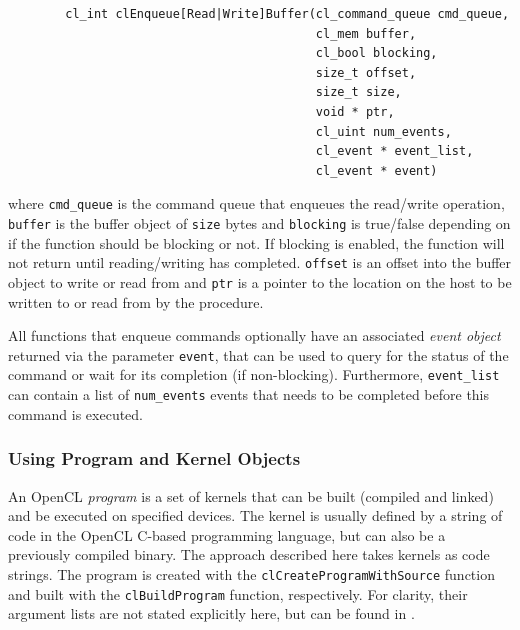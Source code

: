 		\begin{verbatim}
		cl_int clEnqueue[Read|Write]Buffer(cl_command_queue cmd_queue,
		                                   cl_mem buffer,
		                                   cl_bool blocking,
		                                   size_t offset,
		                                   size_t size,
		                                   void * ptr,
		                                   cl_uint num_events,
		                                   cl_event * event_list,
		                                   cl_event * event)
		\end{verbatim}
		
		where \texttt{cmd\_queue} is the command queue that enqueues the read/write operation, \texttt{buffer} is the buffer object of \texttt{size} bytes and \texttt{blocking} is true/false depending on if the function should be blocking or not. If blocking is enabled, the function will not return until reading/writing has completed. \texttt{offset} is an offset into the buffer object to write or read from and \texttt{ptr} is a pointer to the location on the host to be written to or read from by the procedure.
		
		All functions that enqueue commands optionally have an associated \emph{event object} returned via the parameter \texttt{event}, that can be used to query for the status of the command or wait for its completion (if non-blocking). Furthermore, \texttt{event\_list} can contain a list of \texttt{num\_events} events that needs to be completed before this command is executed.
		
	\subsubsection{Using Program and Kernel Objects}
	
		An OpenCL \emph{program} is a set of kernels that can be built (compiled and linked) and be executed on specified devices. The kernel is usually defined by a string of code in the OpenCL C-based programming language, but can also be a previously compiled binary. The approach described here takes kernels as code strings. The program is created with the \texttt{clCreateProgramWithSource} function and built with the \texttt{clBuildProgram} function, respectively. For clarity, their argument lists are not stated explicitly here, but can be found in \cite{openclspec}.
		
